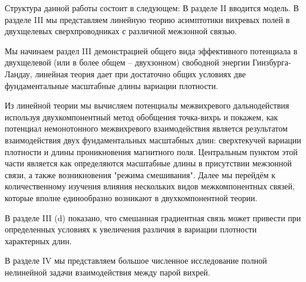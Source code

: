 Структура данной работы состоит в следующем: В разделе II вводится модель. 
В разделе III мы представляем линейную теорию асимптотики вихревых полей в 
двухщелевых сверхпроводниках с различной межзонной связью.

Мы начинаем раздел III демонстрацией общего вида эффективного потенциала в 
двухщелевой (или в более общем -- двухзонном) свободной энергии 
Гинзбурга-Ландау, линейная теория дает при достаточно общих условиях две 
фундаментальные масштабные длины вариации плотности. 

Из линейной теории мы вычисляем потенциалы межвихревого дальнодействия 
используя двухкомпонентный метод обобщения точка-вихрь \cite{bib:19} и 
покажем, как потенциал немонотонного межвихревого взаимодействия является 
результатом взаимодействия двух фундаментальных масштабных длин: сверхтекучей 
вариации плотности и длины проникновения магнитного поля. Центральным пунктом 
этой части является как определяются масштабные длины в присутствии межзонной 
связи, а также возникновения "режима смешивания". Далее мы перейдём к 
количественному изучения влияния нескольких видов межкомпонентных связей, 
которые вполне единообразно возникают в двухкомпонентной теории.

В разделе III (d) показано, что смешанная градиентная связь может привести 
при определенных условиях к увеличения различия в вариации плотности 
характерных длин.

В разделе IV мы представляем большое численное исследование полной нелинейной 
задачи взаимодействия между парой вихрей.
